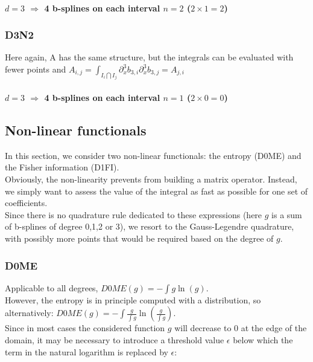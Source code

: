 \documentclass[paper=a4, fontsize=11pt]{scrartcl}
\numberwithin{equation}{section}		%
\numberwithin{figure}{section}			%
\numberwithin{table}{section}				%
\begin{document}
\begin{landscape}
\paragraph{\textbf{$d=3$ $\Rightarrow$ 4 b-splines on each interval $n=2$ ($2\times1=2$)}}

\subsubsection{D3N2}
Here again, A has the same structure, but the integrals can be evaluated with fewer points and $A_{i,j} = \int_{I_i\bigcap I_j}\partial^3_xb_{3,i}\partial^3_xb_{3,j} = A_{j,i}$
\paragraph{\textbf{$d=3$ $\Rightarrow$ 4 b-splines on each interval $n=1$ ($2\times0=0$)}}

\end{landscape}
\newpage
\subsection{Non-linear functionals}

In this section, we consider two non-linear functionals: the entropy (D0ME) and the Fisher information (D1FI).\\
Obviously, the non-linearity prevents from building a matrix operator. Instead, we simply want to assess the value of the integral as fast as possible for one set of coefficients.\\
Since there is no quadrature rule dedicated to these expressions (here $g$ is a sum of b-splines of degree 0,1,2 or 3), we resort to the Gauss-Legendre quadrature, with possibly more points that would be required based on the degree of $g$.


\subsubsection{D0ME}

Applicable to all degrees, $D0ME\left(g\right) = -\int g\ln(g)$.\\
However, the entropy is in principle computed with a distribution, so alternatively: $D0ME\left(g\right) = -\int \frac{g}{\int g}\ln\left(\frac{g}{\int g}\right)$.\\

Since in most cases the considered function $g$ will decrease to 0 at the edge of the domain, it may be necessary to introduce a threshold value $\epsilon$ below which the term in the natural logarithm is replaced by $\epsilon$:
\end{document}
